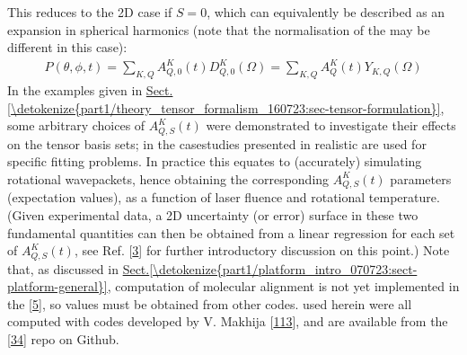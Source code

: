\documentclass[letterpaper,table,10pt,english]{jupyterBook}
\begin{document}
\sphinxAtStartPar
This reduces to the 2D case if \(S=0\), which can equivalently be described as an expansion in spherical harmonics (note that the normalisation of the {\hyperref[\detokenize{backmatter/glossary:term-ADMs}]{}} may be different in this case):
\begin{equation}\label{equation:part1/theory_molecular_alignment_170723:eqn:P-omega-t-2D}
\begin{split} 
P(\theta,\phi,t) = \sum_{K,Q} A^K_{Q,0}(t)D^K_{Q,0}(\Omega) = \sum_{K,Q} A^K_{Q}(t)Y_{K,Q}(\Omega)
\end{split}
\end{equation}
\sphinxAtStartPar
In the examples given in \hyperref[\detokenize{part1/theory_tensor_formalism_160723:sec-tensor-formulation}]{Sect.\@ \ref{\detokenize{part1/theory_tensor_formalism_160723:sec-tensor-formulation}}}, some arbitrary choices of \(A^K_{Q,S}(t)\) were demonstrated to investigate their effects on the tensor basis sets; in the case\sphinxhyphen{}studies presented in {\hyperref[\detokenize{part2/extracting_matrix_elements_overview_270423:chpt-extracting-matrix-elements-overview}]{}} realistic {\hyperref[\detokenize{backmatter/glossary:term-ADMs}]{}} are used for specific fitting problems. In practice this equates to (accurately) simulating rotational wavepackets, hence obtaining the corresponding \(A_{Q,S}^{K}(t)\) parameters (expectation values), as a function of laser fluence and rotational temperature. (Given experimental data, a 2D uncertainty (or error) surface in these two fundamental quantities can then be obtained from a linear regression for each set of \(A_{Q,S}^{K}(t)\), see Ref. {[}\hyperlink{cite.backmatter/bibliography:id684}{3}{]} for further introductory discussion on this point.) Note that, as discussed in \hyperref[\detokenize{part1/platform_intro_070723:sect-platform-general}]{Sect.\@ \ref{\detokenize{part1/platform_intro_070723:sect-platform-general}}}, computation of molecular alignment is not yet implemented in the  {[}\hyperlink{cite.backmatter/bibliography:id680}{5}{]}, so values must be obtained from other codes. {\hyperref[\detokenize{backmatter/glossary:term-ADMs}]{}} used herein were all computed with codes developed by V. Makhija {[}\hyperlink{cite.backmatter/bibliography:id770}{113}{]}, and are available from the  {[}\hyperlink{cite.backmatter/bibliography:id606}{34}{]} repo on Github.
\end{document}
